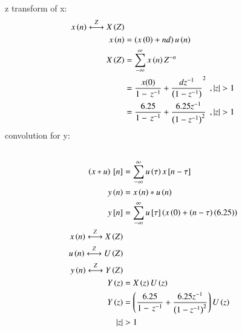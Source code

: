 \documentclass[journal,12pt,twocolumn]{IEEEtran}
\theoremstyle{remark}
\begin{document}
\\z transform of x:
\begin{align}
x\brak{n}\overset{Z}{\longleftrightarrow}  X\brak{Z}
\\x\brak{n}&=\brak{x\brak{0}+nd}u\brak{n}
\\X\brak{Z}&=\sum_{-\infty}^{\infty}x\brak{n}Z^{-n}\
\\&=\frac{x(0)}{1-\,z^{-1}}+\frac{dz^{-1}}{\brak{1-{z^{-1}}}}^2\:\:,|z|>1
\\&=\frac{6.25}{1-\,z^{-1}}+\frac{6.25z^{-1}}{\brak{1-{z^{-1}}}^2}\:\:,|z|>1
\end{align}
convolution for y:
\begin{align}
\\\left(x*u\right){}\left[n\right]&=\sum_{-\infty}^{\infty}{u\left(\tau\right)x{}\left[n-\tau\right]}
\\y\left(n\right)&=x\left(n\right)*u\left(n\right)
\\y{}\left[n\right]&=\sum_{-\infty}^{\infty}{u{}\left[\tau\right]\left(x\left(0\right)+\left(n-\tau\right)\left(6.25\right)\right)}
\\x\left(n\right)\overset{Z}{\longleftrightarrow}  X\left(Z\right)
\\u\left(n\right)\overset{Z}{\longleftrightarrow}  U\left(Z\right)
\\y\left(n\right)\overset{Z}{\longleftrightarrow}  Y\left(Z\right)
\\Y\left(z\right)&=X\left(z\right)U\left(z\right)
\\Y\left(z\right)&=\left(\frac{6.25}{1-\,z^{-1}}+\frac{6.25z^{-1}}{\left(1-{z^{-1}}\right)^2}\right)U\left(z\right)
\\|z|&>1
\end{align}
 
\end{document}
